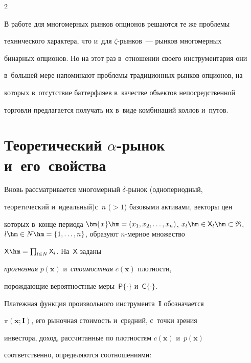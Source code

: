\begin{multicols}{2}
  


  В работе для многомерных рынков опционов решаются те же проблемы 


технического характера, что и~для $\zeta$-рын\-ков~--- рынков  многомерных 


бинарных опционов. Но на этот раз в~отношении своего инструментария они 


в~большей мере напоминают проб\-ле\-мы традиционных рынков опционов, на 


которых в~отсутствие баттерфляев в~качестве объектов непосредственной 


торговли предлагается получать их в~виде комбинаций коллов и~путов. 


  


  \section{Теоретический $\alpha$-рынок и~его~свойства}


  


  Вновь рассматривается многомерный $\delta$-ры\-нок (однопериодный, 


теоретический и~идеальный)\linebreak с~$n$ ($>1$) базовыми активами, векторы цен 


которых в~конце периода $\bm{x}\hm= (x_1, x_2, \ldots, x_n)$, $x_l\hm\in {\sf X}_l \hm\subset 


\mathfrak{R}$, $l\hm\in N\hm=\{1, \ldots , n\}$, образуют $n$-мер\-ное множество 


${\mathsf X}\hm=\prod_{l\in N} {\mathsf X}_l$. На~${\mathsf X}$ заданы 


\textit{прогнозная} $p(\bm{x})$ и~\textit{стоимостная} $c(\bm{x})$ плотности, 


по\-рож\-да\-ющие вероятностные меры~${\mathsf P}\{\cdot\}$ и~${\mathsf 


C}\{\cdot\}$. 


  


  Платежная функция произвольного инструмента~$\bm{I}$ обозначается 


$\pi(\bm{x}; \bm{I})$, его рыночная сто\-и\-мость и~средний, с~точки зрения 


инвестора, доход, рас\-счи\-тан\-ные по плотностям $c(\bm{x})$ и~$p(\bm{x})$ 


соответственно, определяются соотношениями: 



\end{multicols}
